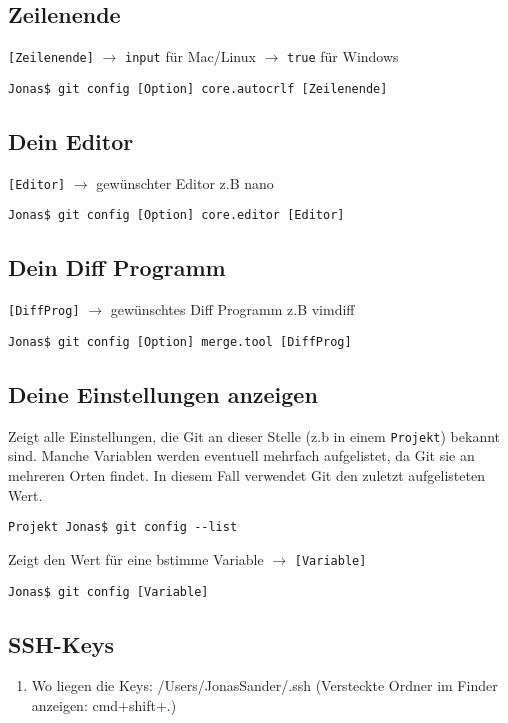 \documentclass[a4paper,8pt,landscape,twocolumn]{scrartcl}
\begin{document}
\subsection{Zeilenende}
\texttt{[Zeilenende]} $\rightarrow$ \texttt{input} für Mac/Linux $\rightarrow$ \texttt{true} für Windows
\begin{lstlisting}[style=bash]
Jonas$ git config [Option] core.autocrlf [Zeilenende]
\end{lstlisting}


\subsection{Dein Editor}
\texttt{[Editor]} $\rightarrow$ gewünschter Editor z.B nano
\begin{lstlisting}[style=bash]
Jonas$ git config [Option] core.editor [Editor]
\end{lstlisting}


\subsection{Dein Diff Programm}
\texttt{[DiffProg]} $\rightarrow$ gewünschtes Diff Programm z.B vimdiff
\begin{lstlisting}[style=bash]
Jonas$ git config [Option] merge.tool [DiffProg]
\end{lstlisting}


\subsection{Deine Einstellungen anzeigen}
Zeigt alle Einstellungen, die Git an dieser Stelle (z.b in einem \texttt{Projekt}) bekannt sind. Manche Variablen werden eventuell mehrfach aufgelistet, da Git sie an mehreren Orten findet. In diesem Fall verwendet Git den zuletzt aufgelisteten Wert.
\begin{lstlisting}[style=bash]
Projekt Jonas$ git config --list
\end{lstlisting}

Zeigt den Wert für eine bstimme Variable $\rightarrow$ \texttt{[Variable]}
\begin{lstlisting}[style=bash]
Jonas$ git config [Variable]
\end{lstlisting}

\subsection{SSH-Keys}
\begin{enumerate}[label=\color{orange}\theenumi]
\item Wo liegen die Keys: /Users/JonasSander/.ssh (Versteckte Ordner im Finder anzeigen: cmd+shift+.)
\end{enumerate}
\end{document}
